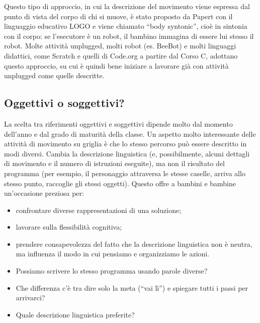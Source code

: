 Questo tipo di approccio, in cui la descrizione del movimento viene espressa dal punto di vista del corpo di chi si muove, è stato proposto da Papert con il linguaggio educativo LOGO e viene chiamato ``body syntonic'', cioè in sintonia con il corpo: se l'esecutore è un robot, il bambino immagina di essere lui stesso il robot. Molte attività unplugged, molti robot (es. BeeBot) e molti linguaggi didattici, come Scratch e quelli di Code.org a partire dal Corso C, adottano questo approccio, su cui è quindi bene iniziare a lavorare già con attività unplugged come quelle descritte.


\figuramovimentirotazioni%

\subsection{Oggettivi o soggettivi?}


La scelta tra riferimenti oggettivi e soggettivi dipende molto dal momento dell'anno e dal grado di maturità della classe. Un aspetto molto interessante delle attività di movimento su griglia è che lo stesso percorso può essere descritto in modi diversi. Cambia la descrizione linguistica (e, possibilmente, alcuni dettagli di movimento e il numero di istruzioni eseguite), ma non il risultato del programma (per esempio, il personaggio attraversa le stesse caselle, arriva allo stesso punto, raccoglie gli stessi oggetti). Questo offre a bambini e bambine un'occasione preziosa per:

\begin{itemize}
\item
  confrontare diverse rappresentazioni di una soluzione;
\item
  lavorare sulla flessibilità cognitiva;
\item
  prendere consapevolezza del fatto che la descrizione linguistica non è neutra, ma influenza il modo in cui pensiamo e organizziamo le azioni.
\end{itemize}

\begin{domandestimolo}\label{domande-stimolo-2}

\begin{itemize}
\item
  Possiamo scrivere lo stesso programma usando parole diverse?
\item
  Che differenza c'è tra dire solo la meta (``vai lì'') e spiegare tutti i passi per arrivarci?
\item
  Quale descrizione linguistica preferite?
\end{itemize}
\end{domandestimolo}

